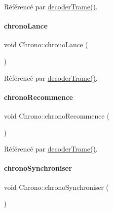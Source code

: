 Référencé par \hyperlink{class_chrono_a9a66b4e81385e2c354805548b94cdfb6}{decoder\+Trame()}.

\mbox{\label{class_chrono_a590290b81a290717bfe1b87f1c605181}} 
\paragraph{\texorpdfstring{chrono\+Lance}{chronoLance}}
{\footnotesize\ttfamily void Chrono\+::chrono\+Lance (\begin{DoxyParamCaption}{ }\end{DoxyParamCaption})\hspace{0.3cm}{\ttfamily [signal]}}



Référencé par \hyperlink{class_chrono_a9a66b4e81385e2c354805548b94cdfb6}{decoder\+Trame()}.

\mbox{\label{class_chrono_ab697687f26503bee2b9c9e6f2a073f14}} 
\paragraph{\texorpdfstring{chrono\+Recommence}{chronoRecommence}}
{\footnotesize\ttfamily void Chrono\+::chrono\+Recommence (\begin{DoxyParamCaption}{ }\end{DoxyParamCaption})\hspace{0.3cm}{\ttfamily [signal]}}



Référencé par \hyperlink{class_chrono_a9a66b4e81385e2c354805548b94cdfb6}{decoder\+Trame()}.

\mbox{\label{class_chrono_a4ae8a6eb8da3f43eb15392b08f391237}} 
\paragraph{\texorpdfstring{chrono\+Synchroniser}{chronoSynchroniser}}
{\footnotesize\ttfamily void Chrono\+::chrono\+Synchroniser (\begin{DoxyParamCaption}{ }\end{DoxyParamCaption})\hspace{0.3cm}{\ttfamily [signal]}}



